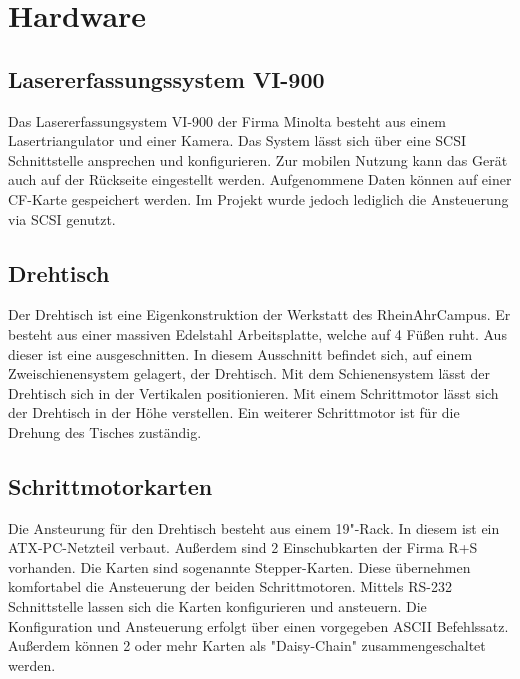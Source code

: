 \chapter{Hardware}
\label{sec:Hardware}
\section{Lasererfassungssystem VI-900}
Das Lasererfassungsystem VI-900 der Firma Minolta besteht aus einem Lasertriangulator und einer Kamera. Das System lässt sich über eine SCSI Schnittstelle ansprechen und konfigurieren. Zur mobilen Nutzung kann das Gerät auch auf der Rückseite eingestellt werden. Aufgenommene Daten können auf einer CF-Karte gespeichert werden. Im Projekt wurde jedoch lediglich die Ansteuerung via SCSI genutzt.
\section{Drehtisch}
Der Drehtisch ist eine Eigenkonstruktion der Werkstatt des RheinAhrCampus. Er besteht aus einer massiven Edelstahl Arbeitsplatte, welche auf 4 Füßen ruht. Aus dieser ist eine  ausgeschnitten. In diesem Ausschnitt befindet sich, auf einem Zweischienensystem gelagert, der Drehtisch. Mit dem Schienensystem lässt der Drehtisch sich in der Vertikalen positionieren. Mit einem Schrittmotor lässt sich der Drehtisch in der Höhe verstellen. Ein weiterer Schrittmotor ist für die Drehung des Tisches zuständig.   
\section{Schrittmotorkarten}
Die Ansteurung für den Drehtisch besteht aus einem 19"-Rack. In diesem ist ein ATX-PC-Netzteil verbaut. Außerdem sind 2 Einschubkarten der Firma R+S vorhanden. Die Karten sind sogenannte Stepper-Karten. Diese übernehmen komfortabel die Ansteuerung der beiden Schrittmotoren. Mittels RS-232 Schnittstelle lassen sich die Karten konfigurieren und ansteuern. Die Konfiguration und Ansteuerung erfolgt über einen vorgegeben ASCII Befehlssatz. Außerdem können 2 oder mehr Karten als "Daisy-Chain" zusammengeschaltet werden. 
